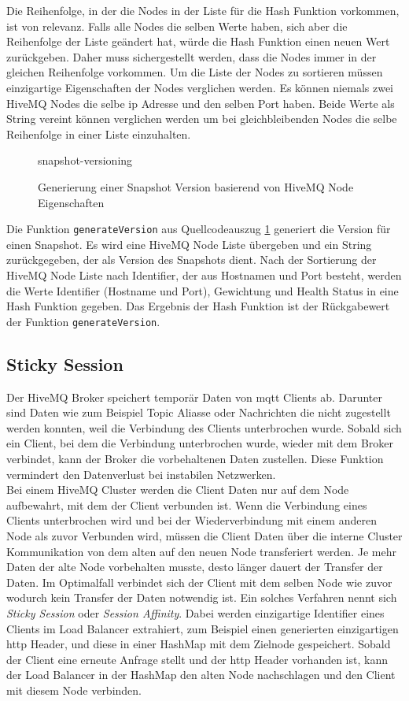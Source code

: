 Die Reihenfolge, in der die Nodes in der Liste für die Hash Funktion vorkommen, ist von relevanz. Falls alle Nodes die selben Werte haben, sich aber die Reihenfolge der Liste geändert hat, würde die Hash Funktion einen neuen Wert zurückgeben. Daher muss sichergestellt werden, dass die Nodes immer in der gleichen Reihenfolge vorkommen. Um die Liste der Nodes zu sortieren müssen einzigartige Eigenschaften der Nodes verglichen werden.
Es können niemals zwei HiveMQ Nodes die selbe \ac{ip} Adresse und den selben Port haben. Beide Werte als String vereint können verglichen werden um bei gleichbleibenden Nodes die selbe Reihenfolge in einer Liste einzuhalten.

\begin{figure}
    {snapshot-versioning}
    \caption{Generierung einer Snapshot Version basierend von HiveMQ Node Eigenschaften}
    \label{code:snapshot-versioning}
\end{figure}
Die Funktion \verb|generateVersion| aus Quellcodeauszug \ref{code:snapshot-versioning} generiert die Version für einen Snapshot. Es wird eine HiveMQ Node Liste übergeben und ein String zurückgegeben, der als Version des Snapshots dient. Nach der Sortierung der HiveMQ Node Liste nach Identifier, der aus Hostnamen und Port besteht, werden die Werte Identifier (Hostname und Port), Gewichtung und Health Status in eine Hash Funktion gegeben. Das Ergebnis der Hash Funktion ist der Rückgabewert der Funktion \verb|generateVersion|.

\subsection{Sticky Session} \label{ss:sticky-session}
Der HiveMQ Broker speichert temporär Daten von \ac{mqtt} Clients ab. Darunter sind Daten wie zum Beispiel Topic Aliasse oder Nachrichten die nicht zugestellt werden konnten, weil die Verbindung des Clients unterbrochen wurde. Sobald sich ein Client, bei dem die Verbindung unterbrochen wurde, wieder mit dem Broker verbindet, kann der Broker die vorbehaltenen Daten zustellen. Diese Funktion vermindert den Datenverlust bei instabilen Netzwerken.
\\
Bei einem HiveMQ Cluster werden die Client Daten nur auf dem Node aufbewahrt, mit dem der Client verbunden ist. Wenn die Verbindung eines Clients unterbrochen wird und bei der Wiederverbindung mit einem anderen Node als zuvor Verbunden wird, müssen die Client Daten über die interne Cluster Kommunikation von dem alten auf den neuen Node transferiert werden. Je mehr Daten der alte Node vorbehalten musste, desto länger dauert der Transfer der Daten.
Im Optimalfall verbindet sich der Client mit dem selben Node wie zuvor wodurch kein Transfer der Daten notwendig ist.
Ein solches Verfahren nennt sich \textit{Sticky Session} oder \textit{Session Affinity}. Dabei werden einzigartige Identifier eines Clients im Load Balancer extrahiert, zum Beispiel einen generierten einzigartigen \ac{http} Header, und diese in einer HashMap mit dem Zielnode gespeichert. Sobald der Client eine erneute Anfrage stellt und der \ac{http} Header vorhanden ist, kann der Load Balancer in der HashMap den alten Node nachschlagen und den Client mit diesem Node verbinden. %

